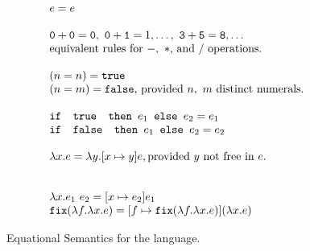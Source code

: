 \begin{figure}
\[
\begin{array}{lr}
e = e \\ \\
\texttt{0} + \texttt{0} = \texttt{0}, \ \texttt{0} + \texttt{1} = 1, \ldots, \ \texttt{3} + \texttt{5} = \texttt{8}, \ldots  \\
\text{equivalent rules for } -, \ * \text{, and } /\text{ operations.}
\\ \\
(n =n) = \texttt{true} \\ (n=m) = \texttt{false}\text{, provided } n, \ m \text{ distinct numerals.}\\ \\ 
\ifelse{\texttt{ true }}{e_1}{e_2} = e_1 \\
\ifelse{\texttt{ false }}{e_1}{e_2} = e_2 \\ \\ 
\lambda x.e = \lambda y.[x \mapsto y]e, \text{provided } y \text{ not free in } e. \\ \\ \\
\lambda x.e_1 \ e_2 = [x \mapsto e_2]e_1 \\
\texttt{fix}(\lambda f. \lambda x.e) = [f \mapsto  \texttt{fix}(\lambda f.\lambda x.e)](\lambda x.e)
\end{array}
\]
\caption{Equational Semantics for the language.}
\label{fig:typing}
\end{figure}

